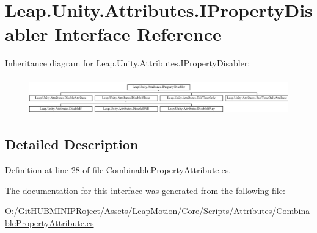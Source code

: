 \hypertarget{interface_leap_1_1_unity_1_1_attributes_1_1_i_property_disabler}{}\section{Leap.\+Unity.\+Attributes.\+I\+Property\+Disabler Interface Reference}
\label{interface_leap_1_1_unity_1_1_attributes_1_1_i_property_disabler}
Inheritance diagram for Leap.\+Unity.\+Attributes.\+I\+Property\+Disabler\+:\begin{figure}[H]
\begin{center}
\leavevmode
\includegraphics[height=1.596958cm]{interface_leap_1_1_unity_1_1_attributes_1_1_i_property_disabler}
\end{center}
\end{figure}


\subsection{Detailed Description}


Definition at line 28 of file Combinable\+Property\+Attribute.\+cs.



The documentation for this interface was generated from the following file\+:\begin{DoxyCompactItemize}
\item 
O\+:/\+Git\+H\+U\+B\+M\+I\+N\+I\+P\+Roject/\+Assets/\+Leap\+Motion/\+Core/\+Scripts/\+Attributes/\mbox{\hyperlink{_combinable_property_attribute_8cs}{Combinable\+Property\+Attribute.\+cs}}\end{DoxyCompactItemize}
